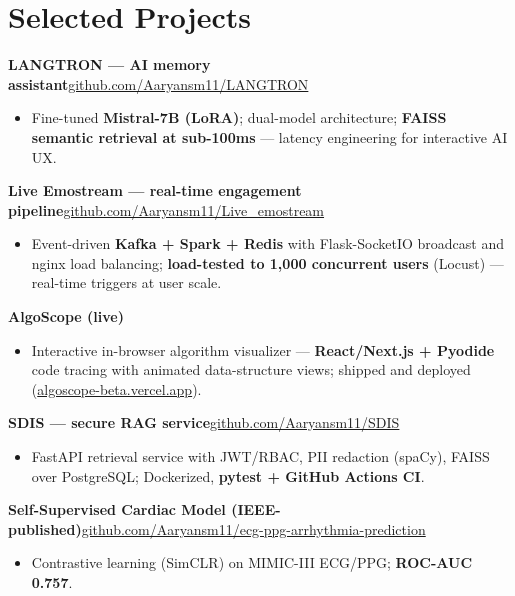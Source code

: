 \documentclass[10pt,a4paper]{article}
\begin{document}
\section*{Selected Projects}
\vspace{1pt}\textbf{LANGTRON --- AI memory assistant}\hfill {\small\href{https://github.com/Aaryansm11/LANGTRON}{github.com/Aaryansm11/LANGTRON}}
\begin{itemize}
\item Fine-tuned \textbf{Mistral-7B (LoRA)}; dual-model architecture; \textbf{FAISS semantic retrieval at sub-100ms} --- latency engineering for interactive AI UX.
\end{itemize}
\vspace{1pt}\textbf{Live Emostream --- real-time engagement pipeline}\hfill {\small\href{https://github.com/Aaryansm11/Live_emostream}{github.com/Aaryansm11/Live\_emostream}}
\begin{itemize}
\item Event-driven \textbf{Kafka + Spark + Redis} with Flask-SocketIO broadcast and nginx load balancing; \textbf{load-tested to 1,000 concurrent users} (Locust) --- real-time triggers at user scale.
\end{itemize}
\vspace{1pt}\textbf{AlgoScope (live)}
\begin{itemize}
\item Interactive in-browser algorithm visualizer --- \textbf{React/Next.js + Pyodide} code tracing with animated data-structure views; shipped and deployed (\href{https://algoscope-beta.vercel.app}{algoscope-beta.vercel.app}).
\end{itemize}
\vspace{1pt}\textbf{SDIS --- secure RAG service}\hfill {\small\href{https://github.com/Aaryansm11/SDIS}{github.com/Aaryansm11/SDIS}}
\begin{itemize}
\item FastAPI retrieval service with JWT/RBAC, PII redaction (spaCy), FAISS over PostgreSQL; Dockerized, \textbf{pytest + GitHub Actions CI}.
\end{itemize}
\vspace{1pt}\textbf{Self-Supervised Cardiac Model (IEEE-published)}\hfill {\small\href{https://github.com/Aaryansm11/ecg-ppg-arrhythmia-prediction}{github.com/Aaryansm11/ecg-ppg-arrhythmia-prediction}}
\begin{itemize}
\item Contrastive learning (SimCLR) on MIMIC-III ECG/PPG; \textbf{ROC-AUC 0.757}.
\end{itemize}
\end{document}
